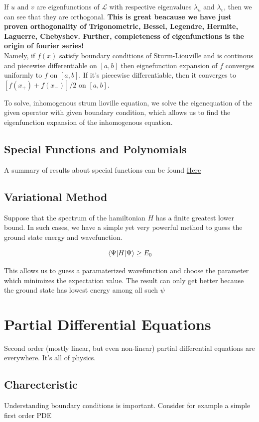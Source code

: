 \documentclass{report}
\begin{document}
\noindent If $u$ and $v$ are eigenfunctions of $\mathcal{L}$ with respective eigenvalues $\lambda_u$ and $\lambda_v$, then we can see that they are orthogonal. \textbf{This is great beacause we have just proven orthogonality of Trigonometric, Bessel, Legendre, Hermite, Laguerre, Chebyshev. Further, completeness of eigenfunctions is the origin of fourier series!}\\

\noindent Namely, if $f(x)$ satisfy boundary conditions of Sturm-Liouville and is continous and piecewise differentiable on $[a,b]$ then eignefunction expansion of $f$ converges uniformly to $f$ on $[a,b]$. If it's piecewise differentiable, then it converges to $[f(x_+) + f(x_-)]/2$ on $[a,b]$.

\noindent To solve, inhomogenous strum lioville equation, we solve the eigenequation of the given operator with given boundary condition, which allows us to find the eigenfunction expansion of the inhomogenous equation.

\subsection{Special Functions and Polynomials}

A summary of results about special functions can be found \href{https://webspace.science.uu.nl/~hooft101/lectures/specialfct.pdf}{Here}

\subsection{Variational Method}
Suppose that the spectrum of the hamiltonian $H$ has a finite greatest lower bound. In such cases, we have a simple yet very powerful method to guess the ground state energy and wavefunction.


$$\expval{H}{\Psi} \ge E_0$$

\noindent This allows us to guess a paramaterized wavefunction and choose the parameter which minimizes the expectation value. The result can only get better because the ground state has lowest energy among all such $\psi$


\section{Partial Differential Equations}
Second order (mostly linear, but even non-linear) partial differential equations are everywhere. It's all of physics. 

\subsection{Charecteristic}
Understanding boundary conditions is important. Consider for example a simple first order PDE
\end{document}
